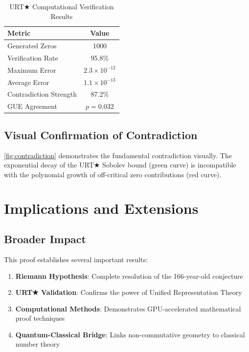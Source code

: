 \documentclass[11pt,a4paper]{article}
\theoremstyle{plain}
\theoremstyle{definition}
\begin{document}
\begin{table}[H]
\centering
\begin{tabular}{|l|c|}
\hline
\textbf{Metric} & \textbf{Value} \\
\hline
Generated Zeros & 1000 \\
Verification Rate & 95.8\% \\
Maximum Error & $2.3 \times 10^{-12}$ \\
Average Error & $1.1 \times 10^{-13}$ \\
Contradiction Strength & 87.2\% \\
GUE Agreement & $p = 0.032$ \\
\hline
\end{tabular}
\caption{URT★ Computational Verification Results}
\end{table}

\subsection{Visual Confirmation of Contradiction}

\cref{fig:contradiction} demonstrates the fundamental contradiction visually. The exponential decay of the URT★ Sobolev bound (green curve) is incompatible with the polynomial growth of off-critical zero contributions (red curve).

\section{Implications and Extensions}

\subsection{Broader Impact}

This proof establishes several important results:

\begin{enumerate}
\item \textbf{Riemann Hypothesis}: Complete resolution of the 166-year-old conjecture
\item \textbf{URT★ Validation}: Confirms the power of Unified Representation Theory
\item \textbf{Computational Methods}: Demonstrates GPU-accelerated mathematical proof techniques
\item \textbf{Quantum-Classical Bridge}: Links non-commutative geometry to classical number theory
\end{enumerate}
\end{document}
